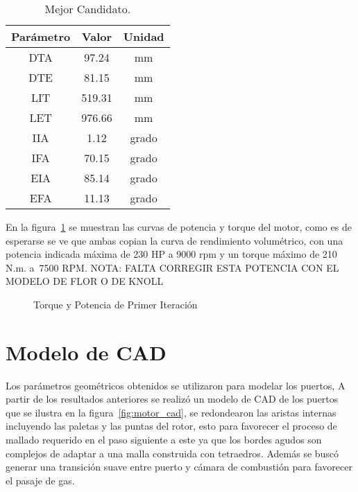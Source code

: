 \begin{table}
  \centering
  \begin{tabular}{ccc} \toprule
    Parámetro & Valor & Unidad \\ \midrule
    DTA & 97.24 & mm\\
    DTE & 81.15 & mm\\
    LIT & 519.31 & mm\\
    LET & 976.66 & mm\\
    IIA & 1.12 & grado\\
    IFA & 70.15 & grado\\
    EIA & 85.14 & grado\\
    EFA & 11.13 & grado\\ \bottomrule
  \end{tabular}
  \caption{Mejor Candidato.}\label{tab:resultado_primer_it}
\end{table}

En la figura~\ref{fig:PoTi_primer_op} se muestran las curvas de potencia y
torque del motor, como es de esperarse se ve que ambas copian la curva de
rendimiento volumétrico, con una potencia indicada máxima de 230 HP a 9000 rpm y
un torque máximo de 210 N.m. a\ 7500 RPM.
NOTA: FALTA CORREGIR ESTA POTENCIA CON EL MODELO DE FLOR O DE KNOLL

\begin{figure}
  \begin{center}
  \end{center}
  \caption{Torque y Potencia de Primer Iteración} \label{fig:PoTi_primer_op}
\end{figure}


\section{Modelo de CAD}
%
Los parámetros geométricos obtenidos se utilizaron para modelar los puertos,
%
A partir de los resultados anteriores se realizó un modelo de CAD de los puertos
que se ilustra en  la figura~\ref{fig:motor_cad}, se redondearon las aristas
internas incluyendo las paletas y las puntas del rotor, esto para favorecer el
proceso de mallado requerido en el paso siguiente a este ya que los bordes
agudos son complejos de adaptar a una malla construida con tetraedros.
%
Además se buscó generar una transición suave entre puerto y cámara de combustión
para favorecer el pasaje de gas.

